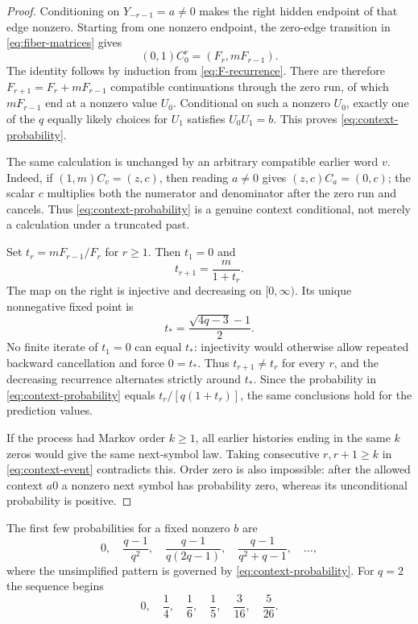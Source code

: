 \documentclass[11pt,a4paper]{amsart}
\theoremstyle{definition}
\theoremstyle{remark}
\begin{document}
\begin{proof}
Conditioning on $Y_{-r-1}=a\ne0$ makes the right hidden endpoint of that edge
nonzero.  Starting from one nonzero endpoint, the zero-edge transition in
\eqref{eq:fiber-matrices} gives
\begin{equation}\label{eq:zero-run-counts}
 (0,1)C_0^r=(F_r,mF_{r-1}).
\end{equation}
The identity follows by induction from \eqref{eq:F-recurrence}.  There are
therefore $F_{r+1}=F_r+mF_{r-1}$ compatible continuations through the zero
run, of which $mF_{r-1}$ end at a nonzero value $U_0$.  Conditional on such
a nonzero $U_0$, exactly one of the $q$ equally likely choices for $U_1$
satisfies $U_0U_1=b$.  This proves \eqref{eq:context-probability}.

The same calculation is unchanged by an arbitrary compatible earlier word
$v$.  Indeed, if $(1,m)C_v=(z,c)$, then reading $a\ne0$ gives
$(z,c)C_a=(0,c)$; the scalar $c$ multiplies both the numerator and denominator
after the zero run and cancels.  Thus \eqref{eq:context-probability} is a
genuine context conditional, not merely a calculation under a truncated past.

Set $t_r=mF_{r-1}/F_r$ for $r\geq1$.  Then $t_1=0$ and
\begin{equation}\label{eq:mobius}
 t_{r+1}=\frac{m}{1+t_r}.
\end{equation}
The map on the right is injective and decreasing on $[0,\infty)$.  Its
unique nonnegative fixed point is
\begin{equation}\label{eq:tstar}
 t_*=\frac{\sqrt{4q-3}-1}{2}.
\end{equation}
No finite iterate of $t_1=0$ can equal $t_*$: injectivity would otherwise
allow repeated backward cancellation and force $0=t_*$.  Thus
$t_{r+1}\ne t_r$ for every $r$, and the decreasing recurrence alternates
strictly around $t_*$.  Since the probability in
\eqref{eq:context-probability} equals
$t_r/[q(1+t_r)]$, the same conclusions hold for the prediction values.

If the process had Markov order $k\geq1$, all earlier histories ending in
the same $k$ zeros would give the same next-symbol law.  Taking consecutive
$r,r+1\geq k$ in \eqref{eq:context-event} contradicts this.  Order zero is
also impossible: after the allowed context $a0$ a nonzero next symbol has
probability zero, whereas its unconditional probability is positive.
\end{proof}

The first few probabilities for a fixed nonzero $b$ are
\[
 0,\quad \frac{q-1}{q^2},\quad
 \frac{q-1}{q(2q-1)},\quad
 \frac{q-1}{q^2+q-1},\quad\ldots,
\]
where the unsimplified pattern is governed by
\eqref{eq:context-probability}.  For $q=2$ the sequence begins
\[
 0,\quad \frac14,\quad \frac16,\quad \frac15,\quad
 \frac3{16},\quad \frac5{26}.
\]
\end{document}
